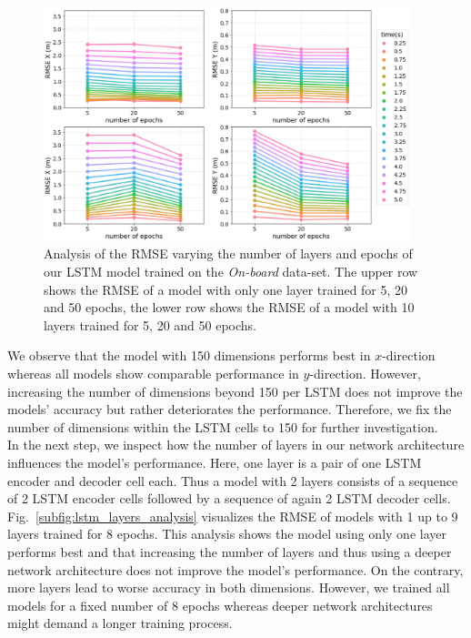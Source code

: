 \begin{figure}[t!]
  \centering
  \includegraphics[width=0.95\textwidth]{imgs/lstm_layers_epochs_analysis.eps}
  \caption{Analysis of the \ac{RMSE} varying the number of layers and epochs of our \ac{LSTM} model trained on the \emph{On-board} data-set. The upper row shows the \ac{RMSE} of a model with only one layer trained for \num{5}, \num{20} and \num{50} epochs, the lower row shows the \ac{RMSE} of a model with \num{10} layers trained for \num{5}, \num{20} and \num{50} epochs.}
  \label{fig:lstm_layers_epochs_analysis}
\end{figure}
We observe that the model with \num{150} dimensions performs best in $x$-direction whereas all models show comparable performance in $y$-direction.
However, increasing the number of dimensions beyond \num{150} per \ac{LSTM} does not improve the models' accuracy but rather deteriorates the performance.
Therefore, we fix the number of dimensions within the \ac{LSTM} cells to \num{150} for further investigation.
\\
In the next step, we inspect how the number of layers in our network architecture influences the model's performance.
Here, one layer is a pair of one \ac{LSTM} encoder and decoder cell each.
Thus a model with \num{2} layers consists of a sequence of \num{2} \ac{LSTM} encoder cells followed by a sequence of again \num{2} \ac{LSTM} decoder cells.
Fig.~\ref{subfig:lstm_layers_analysis} visualizes the \ac{RMSE} of models with \num{1} up to \num{9} layers trained for \num{8} epochs.
This analysis shows the model using only one layer performs best and that increasing the number of layers and thus using a deeper network architecture does not improve the model's performance.
On the contrary, more layers lead to worse accuracy in both dimensions.
However, we trained all models for a fixed number of \num{8} epochs whereas deeper network architectures might demand a longer training process.
